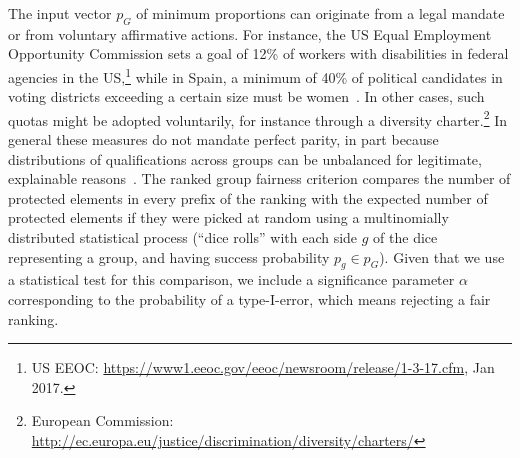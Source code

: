 The input vector $p_G$ of minimum proportions can originate from a legal mandate or from voluntary affirmative actions.
%
For instance, the US Equal Employment Opportunity Commission sets a goal of 12\% of workers with disabilities in federal agencies in the US,\footnote{US EEOC: \url{https://www1.eeoc.gov/eeoc/newsroom/release/1-3-17.cfm}, Jan 2017.}
%
while in Spain, a minimum of 40\% of political candidates in voting districts exceeding a certain size must be women~\cite{verge2010gendering}.
%
In other cases, such quotas might be adopted voluntarily, for instance through a diversity charter.\footnote{European Commission: \url{http://ec.europa.eu/justice/discrimination/diversity/charters/}}
%
In general these measures do not mandate perfect parity, in part because distributions of qualifications across groups can be unbalanced for legitimate, explainable reasons~\cite{zliobaite2011handling,pedreschi2009integrating}. %
%
The ranked group fairness criterion compares the number of protected elements in every prefix of the ranking with the expected number of protected elements if they were picked at random using a multinomially distributed statistical process (``dice rolls'' with each side $g$ of the dice representing a group, and having success probability $p_g \in p_G$).
%
Given that we use a statistical test for this comparison, we include a significance parameter $\alpha$ corresponding to the probability of a type-I-error, which means rejecting a fair ranking.
%


